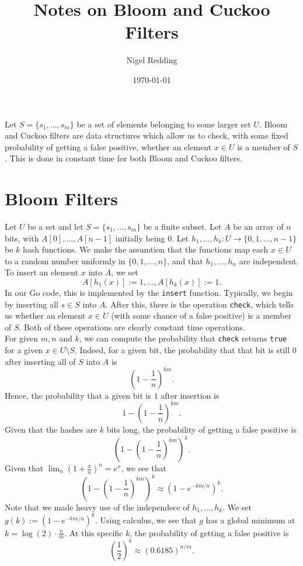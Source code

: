 \documentclass[10pt]{amsart}
\title{Notes on Bloom and Cuckoo Filters}
\author{Nigel Redding}
\date{\today}
\begin{document}
\maketitle

\tableofcontents

Let $S=\{s_1,\ldots,s_m\}$ 
be a set of elements belonging to some larger set $U$. Bloom and Cuckoo filters
are data structures which allow us to check, with some fixed probability of
getting a false positive, whether an element $x \in U$ is a member of $S$.
This is done in constant time for both Bloom and Cuckoo filters.

\section{Bloom Filters}
Let $U$ be a set and let $S = \{s_1,\ldots,s_m\}$ be a finite subset.
Let $A$ be an array of $n$ bits, with $A[0],\ldots,A[n-1]$ initially
being $0$. Let $h_1,\ldots,h_k : U \to \{0,1,\ldots,n-1\}$ be $k$
hash functions. We make the assumtion that the functions map
each $x \in U$ to a random number uniformly in $\{0,1,\ldots,n\}$,
and that $h_1,\ldots,h_n$ are independent.\\

To insert an element $x$ into $A$, we set
$$A[h_1(x)] := 1, \ldots, A[h_k(x)] := 1.$$
In our Go code, this is implemented by the
\texttt{insert} function. Typically, we begin by
inserting all $s \in S$ into $A$. After this,
there is the operation \texttt{check}, which
tells us whether an element $x \in U$ (with some chance
of a false positive) is a member of $S$. Both of these operations
are clearly constant time operations.\\

For given $m,n$ and $k$, we can compute the probability that
\texttt{check} returns \texttt{true} for a given $x \in U \setminus S$.
Indeed, for a given bit, the probability that that bit is still $0$
after inserting all of $S$ into $A$ is $$\left ( 1 - \dfrac{1}{n} \right )^{km} .$$
Hence, the probability that a given bit is $1$ after insertion is 
$$1 - \left ( 1 - \dfrac{1}{n} \right )^{km}.$$ Given that the hashes
are $k$ bits long, the probability of getting a false positive
is $$\left ( 1 - \left ( 1 - \dfrac{1}{n} \right )^{km} \right )^k.$$
Given that $\lim_n (1 + \frac{x}{n})^n = e^x$, we see that
$$\left ( 1 - \left ( 1 - \dfrac{1}{n} \right )^{km} \right )^k
\approx (1 - e^{-km/n})^k.$$ Note that we made heavy use
of the independece of $h_1,\ldots,h_k$. We set
$g(k) := (1 - e^{-km/n})^k$. Using calculus, we see that
$g$ has a global minimum at $k = \log(2) \cdot \frac{n}{m}$. At
this specific $k$, the probability of getting a false positive
is $$\left (\dfrac{1}{2} \right )^k \approx (0.6185)^{n/m}.$$\\
\end{document}
